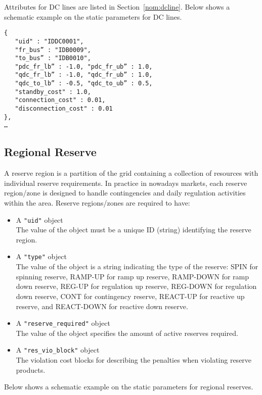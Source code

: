 Attributes for DC lines are listed in Section~\ref{nom:dcline}.
Below shows a schematic example on the static parameters for DC lines.
\begin{verbatim}
{
   "uid" : "IDDC0001",
   "fr_bus” : "IDB0009", 
   "to_bus” : "IDB0010",
   "pdc_fr_lb” : -1.0, "pdc_fr_ub” : 1.0, 
   "qdc_fr_lb” : -1.0, "qdc_fr_ub” : 1.0,
   "qdc_to_lb” : -0.5, "qdc_to_ub” : 0.5,
   "standby_cost" : 1.0,
   "connection_cost" : 0.01,
   "disconnection_cost" : 0.01
},
…    
\end{verbatim}



\subsection{Regional Reserve}
\label{sec:reserve}
A reserve region is a partition of the grid containing a collection of resources with individual reserve requirements.
In practice in nowadays markets, each reserve region/zone is designed to handle contingencies and daily regulation activities within the area.
Reserve regions/zones are required to have: 
\begin{itemize}
    \item A \texttt{"uid"} object\\
    The value of the object must be a unique ID (string) identifying the reserve region.    
    \item A \texttt{"type"} object\\
    The value of the object is a string indicating the type of the reserve: SPIN for spinning reserve, RAMP-UP for ramp up reserve, RAMP-DOWN for ramp down reserve, REG-UP for regulation up reserve, REG-DOWN for regulation down reserve, CONT for contingency reserve, REACT-UP for reactive up reserve, and REACT-DOWN for reactive down reserve.   
    \item A \texttt{"reserve\_required"} object\\
    The value of the object specifies the amount of active reserves required.
    \item A \texttt{"res\_vio\_block"} object\\
    The violation cost blocks for describing the penalties when violating reserve products.
\end{itemize}
Below shows a schematic example on the static parameters for regional reserves. 


